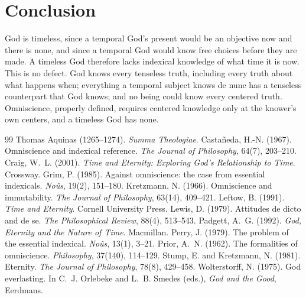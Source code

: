 \documentclass{situationist-preprint}
\begin{document}
\section{Conclusion}

God is timeless, since a temporal God's present would be an objective now and there is none, and since a temporal God would know free choices before they are made. A timeless God therefore lacks indexical knowledge of what time it is now. This is no defect. God knows every tenseless truth, including every truth about what happens when; everything a temporal subject knows de nunc has a tenseless counterpart that God knows; and no being could know every centered truth. Omniscience, properly defined, requires centered knowledge only at the knower's own centers, and a timeless God has none.

\begin{thebibliography}{99}\small
{} Thomas Aquinas (1265--1274). \emph{Summa Theologiae}.
 Casta{\~n}eda, H.-N. (1967). Omniscience and indexical reference. \emph{The Journal of Philosophy}, 64(7), 203--210.
 Craig, W.~L. (2001). \emph{Time and Eternity: Exploring God's Relationship to Time}. Crossway.
 Grim, P. (1985). Against omniscience: the case from essential indexicals. \emph{No{\^u}s}, 19(2), 151--180.
 Kretzmann, N. (1966). Omniscience and immutability. \emph{The Journal of Philosophy}, 63(14), 409--421.
 Leftow, B. (1991). \emph{Time and Eternity}. Cornell University Press.
 Lewis, D. (1979). Attitudes de dicto and de se. \emph{The Philosophical Review}, 88(4), 513--543.
 Padgett, A.~G. (1992). \emph{God, Eternity and the Nature of Time}. Macmillan.
 Perry, J. (1979). The problem of the essential indexical. \emph{No{\^u}s}, 13(1), 3--21.
 Prior, A.~N. (1962). The formalities of omniscience. \emph{Philosophy}, 37(140), 114--129.
 Stump, E. and Kretzmann, N. (1981). Eternity. \emph{The Journal of Philosophy}, 78(8), 429--458.
 Wolterstorff, N. (1975). God everlasting. In C.~J. Orlebeke and L.~B. Smedes (eds.), \emph{God and the Good}, Eerdmans.
\end{thebibliography}
\end{document}
